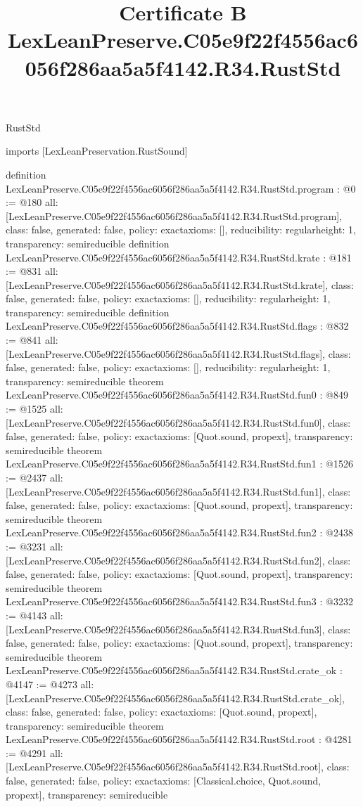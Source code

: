 \begin{lexlean}{RustStd}
\title{Certificate B LexLeanPreserve.C05e9f22f4556ac6056f286aa5a5f4142.R34.RustStd}
\begin{coremodule}
imports [LexLeanPreservation.RustSound]

definition LexLeanPreserve.C05e9f22f4556ac6056f286aa5a5f4142.R34.RustStd.program : @0 := @180 {
  all: [LexLeanPreserve.C05e9f22f4556ac6056f286aa5a5f4142.R34.RustStd.program],
  class: false,
  generated: false,
  policy: exact{axioms: []},
  reducibility: regular{height: 1},
  transparency: semireducible
}
definition LexLeanPreserve.C05e9f22f4556ac6056f286aa5a5f4142.R34.RustStd.krate : @181 := @831 {
  all: [LexLeanPreserve.C05e9f22f4556ac6056f286aa5a5f4142.R34.RustStd.krate],
  class: false,
  generated: false,
  policy: exact{axioms: []},
  reducibility: regular{height: 1},
  transparency: semireducible
}
definition LexLeanPreserve.C05e9f22f4556ac6056f286aa5a5f4142.R34.RustStd.flags : @832 := @841 {
  all: [LexLeanPreserve.C05e9f22f4556ac6056f286aa5a5f4142.R34.RustStd.flags],
  class: false,
  generated: false,
  policy: exact{axioms: []},
  reducibility: regular{height: 1},
  transparency: semireducible
}
theorem LexLeanPreserve.C05e9f22f4556ac6056f286aa5a5f4142.R34.RustStd.fun0 : @849 := @1525 {
  all: [LexLeanPreserve.C05e9f22f4556ac6056f286aa5a5f4142.R34.RustStd.fun0],
  class: false,
  generated: false,
  policy: exact{axioms: [Quot.sound, propext]},
  transparency: semireducible
}
theorem LexLeanPreserve.C05e9f22f4556ac6056f286aa5a5f4142.R34.RustStd.fun1 : @1526 := @2437 {
  all: [LexLeanPreserve.C05e9f22f4556ac6056f286aa5a5f4142.R34.RustStd.fun1],
  class: false,
  generated: false,
  policy: exact{axioms: [Quot.sound, propext]},
  transparency: semireducible
}
theorem LexLeanPreserve.C05e9f22f4556ac6056f286aa5a5f4142.R34.RustStd.fun2 : @2438 := @3231 {
  all: [LexLeanPreserve.C05e9f22f4556ac6056f286aa5a5f4142.R34.RustStd.fun2],
  class: false,
  generated: false,
  policy: exact{axioms: [Quot.sound, propext]},
  transparency: semireducible
}
theorem LexLeanPreserve.C05e9f22f4556ac6056f286aa5a5f4142.R34.RustStd.fun3 : @3232 := @4143 {
  all: [LexLeanPreserve.C05e9f22f4556ac6056f286aa5a5f4142.R34.RustStd.fun3],
  class: false,
  generated: false,
  policy: exact{axioms: [Quot.sound, propext]},
  transparency: semireducible
}
theorem LexLeanPreserve.C05e9f22f4556ac6056f286aa5a5f4142.R34.RustStd.crate_ok : @4147 := @4273 {
  all: [LexLeanPreserve.C05e9f22f4556ac6056f286aa5a5f4142.R34.RustStd.crate_ok],
  class: false,
  generated: false,
  policy: exact{axioms: [Quot.sound, propext]},
  transparency: semireducible
}
theorem LexLeanPreserve.C05e9f22f4556ac6056f286aa5a5f4142.R34.RustStd.root : @4281 := @4291 {
  all: [LexLeanPreserve.C05e9f22f4556ac6056f286aa5a5f4142.R34.RustStd.root],
  class: false,
  generated: false,
  policy: exact{axioms: [Classical.choice, Quot.sound, propext]},
  transparency: semireducible
}


\end{coremodule}
\end{lexlean}

